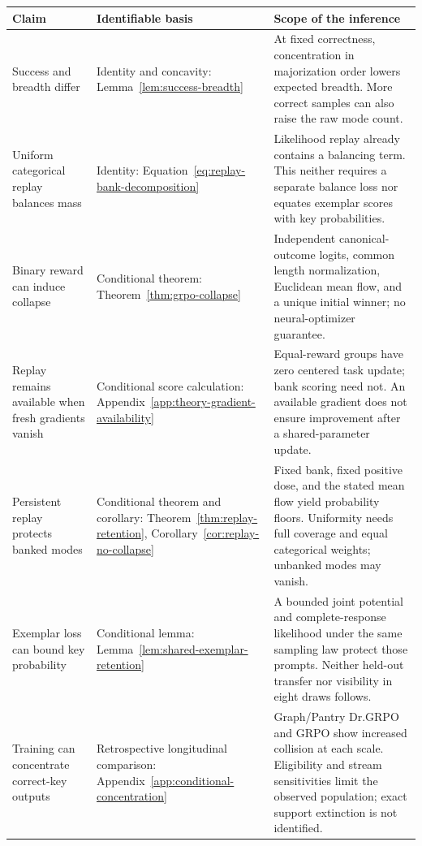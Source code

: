 \documentclass{article}
\newcommand{\1}{\mathbf 1}
\theoremstyle{remark}
\theoremstyle{definition}
\theoremstyle{plain}
\begin{document}
\begin{table}[H]
\centering
\small
\setlength{\tabcolsep}{5pt}
\renewcommand{\arraystretch}{1.16}
\begin{tabularx}{\linewidth}{@{}p{.21\linewidth}p{.22\linewidth}X@{}}
\toprule
\textbf{Claim} & \textbf{Identifiable basis} & \textbf{Scope of the inference} \\
\midrule
Success and breadth differ & Identity and concavity: Lemma~\ref{lem:success-breadth} &
At fixed correctness, concentration in majorization order lowers expected breadth.
More correct samples can also raise the raw mode count. \\
Uniform categorical replay balances mass & Identity: Equation~\eqref{eq:replay-bank-decomposition} &
Likelihood replay already contains a balancing term. This neither requires a
separate balance loss nor equates exemplar scores with key probabilities. \\
Binary reward can induce collapse & Conditional theorem: Theorem~\ref{thm:grpo-collapse} &
Independent canonical-outcome logits, common length normalization, Euclidean
mean flow, and a unique initial winner; no neural-optimizer guarantee. \\
Replay remains available when fresh gradients vanish & Conditional score calculation:
Appendix~\ref{app:theory-gradient-availability} &
Equal-reward groups have zero centered task update; bank scoring need not.
An available gradient does not ensure improvement after a shared-parameter update. \\
Persistent replay protects banked modes & Conditional theorem and corollary:
Theorem~\ref{thm:replay-retention}, Corollary~\ref{cor:replay-no-collapse} &
Fixed bank, fixed positive dose, and the stated mean flow yield probability
floors. Uniformity needs full coverage and equal categorical weights;
unbanked modes may vanish. \\
Exemplar loss can bound key probability & Conditional lemma:
Lemma~\ref{lem:shared-exemplar-retention} &
A bounded joint potential and complete-response likelihood under the same
sampling law protect those prompts. Neither held-out transfer nor visibility
in eight draws follows. \\
Training can concentrate correct-key outputs & Retrospective longitudinal comparison:
Appendix~\ref{app:conditional-concentration} &
Graph/Pantry Dr.GRPO and GRPO show increased collision at each scale.
Eligibility and stream sensitivities limit the observed population; exact
support extinction is not identified. \\

\end{tabularx}
\end{table}
\end{document}
